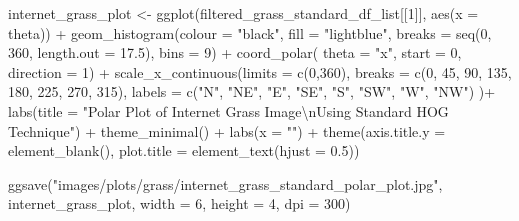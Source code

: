 \documentclass[
  letterpaper,
  DIV=11,
  numbers=noendperiod]{scrreprt}
\newenvironment{Shaded}{\begin{snugshade}}{\end{snugshade}}
\newcommand{\AttributeTok}[1]{\textcolor[rgb]{0.40,0.45,0.13}{#1}}
\newcommand{\DecValTok}[1]{\textcolor[rgb]{0.68,0.00,0.00}{#1}}
\newcommand{\FloatTok}[1]{\textcolor[rgb]{0.68,0.00,0.00}{#1}}
\newcommand{\FunctionTok}[1]{\textcolor[rgb]{0.28,0.35,0.67}{#1}}
\newcommand{\NormalTok}[1]{\textcolor[rgb]{0.00,0.23,0.31}{#1}}
\newcommand{\OtherTok}[1]{\textcolor[rgb]{0.00,0.23,0.31}{#1}}
\newcommand{\SpecialCharTok}[1]{\textcolor[rgb]{0.37,0.37,0.37}{#1}}
\newcommand{\StringTok}[1]{\textcolor[rgb]{0.13,0.47,0.30}{#1}}
\begin{document}
\begin{Shaded}
\begin{Highlighting}[]
\NormalTok{internet\_grass\_plot }\OtherTok{\textless{}{-}}
  \FunctionTok{ggplot}\NormalTok{(filtered\_grass\_standard\_df\_list[[}\DecValTok{1}\NormalTok{]], }
         \FunctionTok{aes}\NormalTok{(}\AttributeTok{x =}\NormalTok{ theta)) }\SpecialCharTok{+}
  \FunctionTok{geom\_histogram}\NormalTok{(}\AttributeTok{colour =} \StringTok{"black"}\NormalTok{, }
                 \AttributeTok{fill =} \StringTok{"lightblue"}\NormalTok{, }
                 \AttributeTok{breaks =} \FunctionTok{seq}\NormalTok{(}\DecValTok{0}\NormalTok{, }\DecValTok{360}\NormalTok{, }\AttributeTok{length.out =} \FloatTok{17.5}\NormalTok{),}
                 \AttributeTok{bins =} \DecValTok{9}\NormalTok{) }\SpecialCharTok{+}
  \FunctionTok{coord\_polar}\NormalTok{(}
    \AttributeTok{theta =} \StringTok{"x"}\NormalTok{, }
    \AttributeTok{start =} \DecValTok{0}\NormalTok{, }
    \AttributeTok{direction =} \DecValTok{1}\NormalTok{) }\SpecialCharTok{+}
  \FunctionTok{scale\_x\_continuous}\NormalTok{(}\AttributeTok{limits =} \FunctionTok{c}\NormalTok{(}\DecValTok{0}\NormalTok{,}\DecValTok{360}\NormalTok{),}
    \AttributeTok{breaks =} \FunctionTok{c}\NormalTok{(}\DecValTok{0}\NormalTok{, }\DecValTok{45}\NormalTok{, }\DecValTok{90}\NormalTok{, }\DecValTok{135}\NormalTok{, }\DecValTok{180}\NormalTok{, }\DecValTok{225}\NormalTok{, }\DecValTok{270}\NormalTok{, }\DecValTok{315}\NormalTok{), }
    \AttributeTok{labels =} \FunctionTok{c}\NormalTok{(}\StringTok{"N"}\NormalTok{, }\StringTok{"NE"}\NormalTok{, }\StringTok{"E"}\NormalTok{, }\StringTok{"SE"}\NormalTok{, }\StringTok{"S"}\NormalTok{, }\StringTok{"SW"}\NormalTok{, }\StringTok{"W"}\NormalTok{, }\StringTok{"NW"}\NormalTok{)}
\NormalTok{  )}\SpecialCharTok{+}
  \FunctionTok{labs}\NormalTok{(}\AttributeTok{title =} \StringTok{"Polar Plot of Internet Grass Image}\SpecialCharTok{\textbackslash{}n}\StringTok{Using Standard HOG Technique"}\NormalTok{) }\SpecialCharTok{+}
  \FunctionTok{theme\_minimal}\NormalTok{() }\SpecialCharTok{+}
  \FunctionTok{labs}\NormalTok{(}\AttributeTok{x =} \StringTok{""}\NormalTok{) }\SpecialCharTok{+}
  \FunctionTok{theme}\NormalTok{(}\AttributeTok{axis.title.y =} \FunctionTok{element\_blank}\NormalTok{(),}
        \AttributeTok{plot.title =} \FunctionTok{element\_text}\NormalTok{(}\AttributeTok{hjust =} \FloatTok{0.5}\NormalTok{))}

\FunctionTok{ggsave}\NormalTok{(}\StringTok{"images/plots/grass/internet\_grass\_standard\_polar\_plot.jpg"}\NormalTok{, internet\_grass\_plot, }\AttributeTok{width =} \DecValTok{6}\NormalTok{, }\AttributeTok{height =} \DecValTok{4}\NormalTok{, }\AttributeTok{dpi =} \DecValTok{300}\NormalTok{)}
\end{Highlighting}
\end{Shaded}
\end{document}

